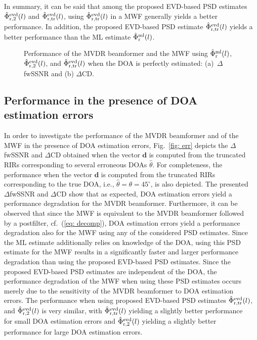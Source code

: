 \documentclass{article}
\begin{document}
In summary, it can be said that among the proposed EVD-based PSD estimates $\hat{\Phi}^{\rm evd}_{\rm r,2}(l)$ and $\hat{\Phi}^{\rm evd}_{\rm r,tr}(l)$, using $\hat{\Phi}^{\rm evd}_{\rm r,tr}(l)$ in a MWF generally yields a better performance.
In addition, the proposed EVD-based PSD estimate $\hat{\Phi}^{\rm evd}_{\rm r,tr}(l)$ yields a better performance than the ML estimate $\hat{\Phi}^{\rm ml}_{\rm r}(l)$.

\begin{figure}[t!]

\caption{Performance of the MVDR beamformer and the MWF using $\hat{\Phi}^{\rm ml}_{\rm r}(l)$, $\hat{\Phi}^{\rm evd}_{\rm r, 2}(l)$, and $\hat{\Phi}^{\rm evd}_{\rm r, tr}(l)$ when the DOA is perfectly estimated: (a)~$\Delta$fwSSNR and (b) $\Delta$CD.}
\label{fig: perfect}
\end{figure}

\subsection{Performance in the presence of DOA estimation errors}
\label{sec: exp2}
In order to investigate the performance of the MVDR beamformer and of the MWF in the presence of DOA estimation errors, Fig.~\ref{fig: err} depicts the $\Delta$fwSSNR and $\Delta$CD obtained when the vector $\mathbf{d}$ is computed from the truncated RIRs corresponding to several erroneous DOAs $\hat{\theta}$.
For completeness, the performance when the vector $\mathbf{d}$ is computed from the truncated RIRs corresponding to the true DOA, i.e., $\hat{\theta} = \theta = 45^{\circ}$, is also depicted.
The presented $\Delta$fwSSNR and $\Delta$CD show that as expected, DOA estimation errors yield a performance degradation for the MVDR beamformer.
Furthermore, it can be observed that since the MWF is equivalent to the MVDR beamformer followed by a postfilter, cf.~(\ref{eq: decomp}), DOA estimation errors yield a performance degradation also for the MWF using any of the considered PSD estimates.
Since the ML estimate additionally relies on knowledge of the DOA, using this PSD estimate for the MWF results in a significantly faster and larger performance degradation than using the proposed EVD-based PSD estimates.
Since the proposed EVD-based PSD estimates are independent of the DOA, the performance degradation of the MWF when using these PSD estimates occurs merely due to the sensitivity of the MVDR beamformer to DOA estimation errors.
The performance when using proposed EVD-based PSD estimates $\hat{\Phi}^{\rm evd}_{\rm r, tr}(l)$, and $\hat{\Phi}^{\rm evd}_{\rm r, 2}(l)$ is very similar, with $\hat{\Phi}^{\rm evd}_{\rm r, tr}(l)$ yielding a slightly better performance for small DOA estimation errors and $\hat{\Phi}^{\rm evd}_{\rm r, 2}(l)$ yielding a slightly better performance for large DOA estimation errors.
\end{document}
